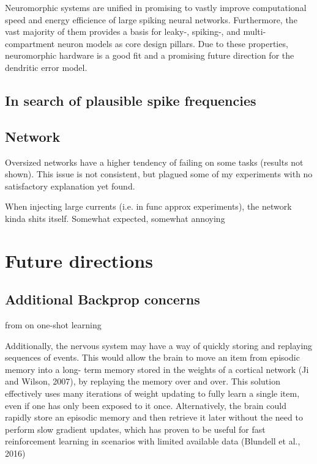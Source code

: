 Neuromorphic systems are unified in promising to vastly improve computational speed and energy efficience of large
spiking neural networks. Furthermore, the vast majority of them provides a basis for leaky-, spiking-, and
multi-compartment neuron models as core design pillars. Due to these properties, neuromorphic hardware is a good fit and
a promising future direction for the dendritic error model.






\subsection{In search of plausible spike frequencies}

\subsection*{Network}

Oversized networks have a higher tendency of failing on some tasks (results not shown). This issue is not consistent,
but plagued some of my experiments with no satisfactory explanation yet found.


 When injecting large currents (i.e. in func approx experiments), the network kinda shits itself. Somewhat
expected, somewhat annoying




\section{Future directions}

\subsection{Additional Backprop concerns}


from \citep{Marblestone2016} on one-shot learning

Additionally, the nervous system may have a way of quickly
storing and replaying sequences of events. This would allow
the brain to move an item from episodic memory into a long-
term memory stored in the weights of a cortical network (Ji and
Wilson, 2007), by replaying the memory over and over. This
solution effectively uses many iterations of weight updating to
fully learn a single item, even if one has only been exposed to
it once. Alternatively, the brain could rapidly store an episodic
memory and then retrieve it later without the need to perform
slow gradient updates, which has proven to be useful for
fast reinforcement learning in scenarios with limited available
data (Blundell et al., 2016)


